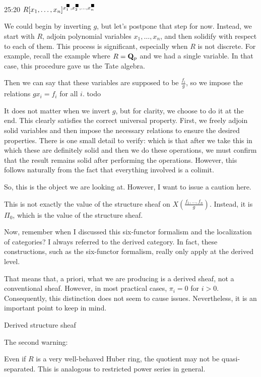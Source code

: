 \begin{unfinished}{25:20}
\bq
$R[x_1,\dots, x_n]^{x_1^\blacksquare, x_2^\blacksquare, \ldots, x_n^\blacksquare}$
\eq

We could begin by inverting $g$, but let's postpone that step for now. Instead, we start with $R$, adjoin polynomial variables $x_1, \ldots, x_n$, and then solidify with respect to each of them. This process is significant, especially when $R$ is not discrete.
For example, recall the example where $R = \mathbf Q_p$ and we had a single variable. In that case, this procedure gave us the Tate algebra.

Then we can say that these variables are supposed to be $\frac{f_i}{g}$, so we impose the relations $gx_i = f_i$ for all $i$. todo

It does not matter when we invert $g$, but for clarity, we choose to do it at the end. This clearly satisfies the correct universal property.
First, we freely adjoin solid variables and then impose the necessary relations to ensure the desired properties. There is one small detail to verify: which is that after we take this in which these are definitely solid and then we do these operations, we must confirm that the result remains solid after performing the operations. However, this follows naturally from the fact that everything involved is a colimit.

So, this is the object we are looking at. However, I want to issue a caution here.

\begin{warning}
This is not exactly the value of the structure sheaf on $X(\frac{f_1, \ldots, f_n}{g})$. Instead, it is $\Pi_0$, which is the value of the structure sheaf. 

Now, remember when I discussed this six-functor formalism and the localization of categories? I always referred to the derived category. 
In fact, these constructions, such as the six-functor formalism, really only apply at the derived level.

That means that, a priori, what we are producing is a derived sheaf, not a conventional sheaf.
However, in most practical cases, $\pi_i = 0$ for $i > 0$. Consequently, this distinction does not seem to cause issues. Nevertheless, it is an important point to keep in mind.
\end{warning}

Derived structure sheaf


The second warning:
\begin{warning}
Even if $R$ is a very well-behaved Huber ring, the quotient may not be quasi-separated. This is analogous to restricted power series in general.\\


\end{warning}
\end{unfinished}
